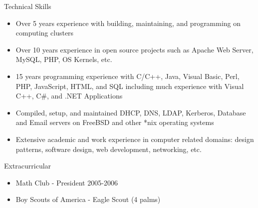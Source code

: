 \documentclass[10pt]{article}
\begin{document}
\begin{cv}
\begin{cvlist}{Technical Skills}
\item
\begin{itemize}\itemsep=0.25em
  \item Over 5 years experience with building, maintaining, and programming on computing clusters
  \item Over 10 years experience in open source projects such as Apache Web Server, MySQL, PHP, OS Kernels, etc.
  \item 15 years programming experience with C/C++, Java, Visual Basic, Perl, PHP, JavaScript,
    HTML, and SQL including much experience with Visual C++, C\#, and .NET Applications
  \item Compiled, setup, and maintained DHCP, DNS, LDAP, Kerberos, Database and Email servers on
    FreeBSD and other *nix operating systems
  \item Extensive academic and work experience in computer related domains: design patterns,
    software design, web development, networking, etc.
\end{itemize}
\end{cvlist}

\begin{cvlist}{Extracurricular}
\item
\begin{itemize}\itemsep=0.25em
  \item Math Club - President 2005-2006
  \item Boy Scouts of America - Eagle Scout (4 palms)
\end{itemize}
\end{cvlist}

\end{cv}
\end{document}
